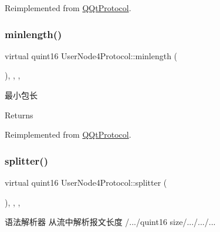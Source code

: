 Reimplemented from \mbox{\hyperlink{class_q_qt_protocol_af41bc3116abbbcfc9af45e151a253ff7}{Q\+Qt\+Protocol}}.

\mbox{\label{class_user_node4_protocol_aea49d45bea054294a8cc318151b80795}} 
\subsubsection{\texorpdfstring{minlength()}{minlength()}}
{\footnotesize\ttfamily virtual quint16 User\+Node4\+Protocol\+::minlength (\begin{DoxyParamCaption}{ }\end{DoxyParamCaption})\hspace{0.3cm}{\ttfamily [inline]}, {\ttfamily [override]}, {\ttfamily [protected]}, {\ttfamily [virtual]}}



最小包长 

\begin{DoxyReturn}{Returns}

\end{DoxyReturn}


Reimplemented from \mbox{\hyperlink{class_q_qt_protocol_a2b00f53d3dd0eed817eeecff422891f3}{Q\+Qt\+Protocol}}.

\mbox{\label{class_user_node4_protocol_a700906b1138f7c2aa655aac6d4cfcd28}} 
\subsubsection{\texorpdfstring{splitter()}{splitter()}}
{\footnotesize\ttfamily virtual quint16 User\+Node4\+Protocol\+::splitter (\begin{DoxyParamCaption}\item[{const Q\+Byte\+Array \&}]{ }\end{DoxyParamCaption})\hspace{0.3cm}{\ttfamily [inline]}, {\ttfamily [override]}, {\ttfamily [protected]}, {\ttfamily [virtual]}}



语法解析器 从流中解析报文长度 /.../quint16 size/.../.../... 



